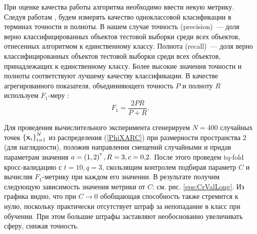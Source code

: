 

При оценке качества работы алгоритма необходимо ввести некую метрику. 
Следуя работам  \cite{Romanenko2012}, будем измерять качество одноклассовой класификации в терминах точности и полноты. 
В нашем случае точность (precision)~--- доля верно классифицированных объектов тестовой выборки среди всех объектов, отнесенных алгоритмом к единственному классу. Полнота (recall)~--- доля верно классифицированных объектов тестовой выборки среди всех объектов, принадлежащих к единственному классу. Более высокие значения точности и полноты соответствуют лучшему качеству классификации. В качестве агрегированного показателя, объединияющего точность $P$ и полноту $R$ используем $F_1$-меру \cite{Rijsbergen1979}:
$$F_1 = \frac{2PR}{P+R}.$$

Для проведения вычислительного эксперимента сгенерируем $N=400$ случайных точек $\left\{\boldsymbol{\mathbf{x}}_i\right\}_{i=1}^N$ из распределения (\ref{PhiXARC}) при размерности пространства $2$ (для наглядности), положив направления смещений случайными и придав параметрам значения $a = \left(1,2\right)^{\text{\tiny\sffamily\upshape\mdseries T}}, R = 3, c = 0{,}2.$
После этого проведем tq-fold кросс-валидацию с $t = 10, q = 3$, скользящим контролем подбирая параметр $C$ и вычисляя $F_1$-метрику при каждом его значении. В результате получим следующую зависимость значения метрики от $C$: см. рис. \ref{eps:CrValLong}.
Из графика видно, что при $C\to 0$ обобщающая способность также стремится к нулю, поскольку практически отсутствует штраф за непопадание в класс при обучении. При этом большие штрафы заставляют необоснованно увеличивать сферу, снижая точность.

